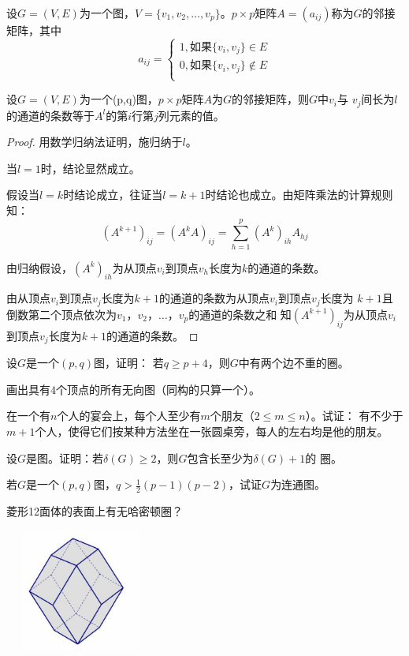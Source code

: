 \begin{Def}
  设$G=(V,E)$为一个图，$V=\{v_1,v_2,\ldots,v_p\}$。$p\times p$矩阵$A=(a_{ij})$称为$G$的邻接矩阵，其中
  \[a_{ij}=\begin{cases}
      1, \text{如果}\{v_i,v_j\}\in E\\
      0, \text{如果}\{v_i,v_j\}\notin E\\
    \end{cases}
  \]
\end{Def}
  \begin{Thm}
    设$G=(V,E)$为一个(p,q)图，$p\times p$矩阵$A$为$G$的邻接矩阵，则$G$中$v_i$与
    $v_j$间长为$l$的通道的条数等于$A^l$的第$i$行第$j$列元素的值。
  \end{Thm}
  \begin{proof}
      用数学归纳法证明，施归纳于$l$。

  当$l=1$时，结论显然成立。

  假设当$l=k$时结论成立，往证当$l=k+1$时结论也成立。由矩阵乘法的计算规则知：
  \[(A^{k+1})_{ij} = (A^{k}A)_{ij} = \sum_{h=1}^p(A^k)_{ih}A_{hj}\]

  由归纳假设，$(A^k)_{ih}$为从顶点$v_i$到顶点$v_h$长度为$k$的通道的条数。

  由从顶点$v_i$到顶点$v_j$长度为$k+1$的通道的条数为从顶点$v_i$到顶点$v_j$长度为
  $k+1$且倒数第二个顶点依次为$v_1$，$v_2$，$\ldots$，$v_p$的通道的条数之和
  知$(A^{k+1})_{ij}$为从顶点$v_i$到顶点$v_j$长度为$k+1$的通道的条数。
  \end{proof}
    \begin{Exercise}
    设$G$是一个$(p,q)$图，证明：
    若$q \geq p + 4$，则$G$中有两个边不重的圈。
  \end{Exercise}
  \begin{Exercise}
    画出具有$4$个顶点的所有无向图（同构的只算一个）。
  \end{Exercise}
    \begin{Exercise}
    在一个有$n$个人的宴会上，每个人至少有$m$个朋友（$2 \leq m \leq n$）。试证：
    有不少于$m+1$个人，使得它们按某种方法坐在一张圆桌旁，每人的左右均是他的朋友。
  \end{Exercise}
  \begin{Exercise}
    设$G$是图。证明：若$\delta (G) \geq 2$，则$G$包含长至少为$\delta (G) + 1$的
    圈。
  \end{Exercise}
  \begin{Exercise}
      若$G$是一个$(p,q)$图，$q > \frac{1}{2}(p-1)(p-2)$，试证$G$为连通图。  
    \end{Exercise}
    \begin{Exercise}
      菱形12面体的表面上有无哈密顿圈？
      
  \includegraphics[width=5cm,height=4cm]{timg}  
\end{Exercise}

